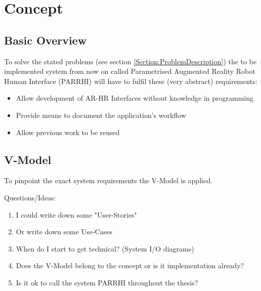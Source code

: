 \chapter{Concept}\label{Chap:Concept}

\section{Basic Overview}
To solve the stated problems (see section \ref{Section:ProblemDescription}) the to be implemented system from now on called Parametrised Augmented Reality Robot Human Interface (PARRHI) will have to fulfil these (very abstract) requirements:
\begin{itemize}
	\setlength\itemsep{-1em}
	\item Allow development of AR-HR Interfaces without knowledge in programming	
	\item Provide means to document the application's workflow
	\item Allow previous work to be reused
\end{itemize}



\section{V-Model}
To pinpoint the exact system requirements the V-Model is applied. 

Questions/Ideas:
\begin{enumerate}
	\setcounter{enumi}{0}
	\setlength\itemsep{-2em}
	\item I could write down some "User-Stories" 
	\item Or write down some Use-Cases
	\item When do I start to get technical? (System I/O diagrams)
	\item Does the V-Model belong to the concept or is it implementation already?
	\item Is it ok to call the system PARRHI throughout the thesis?
\end{enumerate}


















